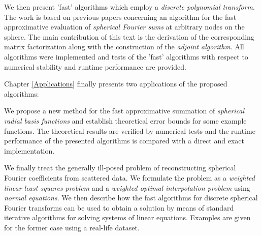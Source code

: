 We then present 'fast' algorithms which employ a \emph{discrete
polynomial transform}. The work is based on  previous papers concerning an
algorithm for  the fast approximative evaluation of \emph{spherical Fourier
sums} at arbitrary nodes on the 
sphere. The main contribution of this text is the derivation of the
corresponding matrix factorization along with the construction of the 
\emph{adjoint algorithm}. All algorithms were implemented and tests  of the
'fast' algorithms with respect to numerical stability and  runtime performance
are provided. 

Chapter \ref{Applications} finally presents two applications of
the  proposed algorithms: 

We propose a new method for the fast  approximative summation of
\emph{spherical radial basis functions} and establish theoretical error bounds for
some example functions. The  theoretical results are verified by numerical
tests and the runtime performance of the presented algorithms is compared with
a direct and exact implementation.

We finally treat the generally ill-posed problem of reconstructing  spherical
Fourier coefficients from scattered data. We formulate the problem as a
\emph{weighted linear least squares problem} and a \emph{weighted optimal
interpolation problem} using \emph{normal equations}. We then describe how the fast
algorithms for discrete spherical Fourier transforms can be used to obtain  a
solution by means of standard iterative algorithms for solving systems of linear
equations. Examples are given for the former case using  a real-life dataset.

